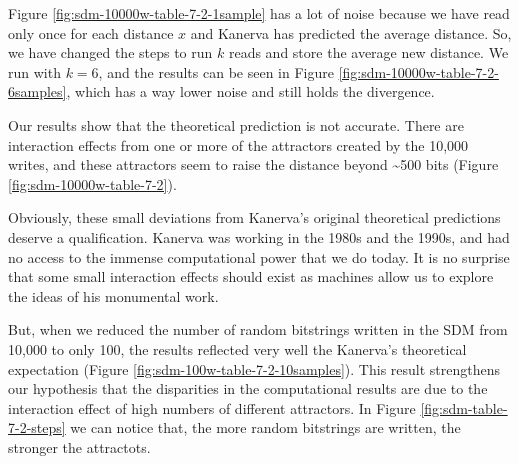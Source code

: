 Figure \ref{fig:sdm-10000w-table-7-2-1sample} has a lot of noise because we have read only once for each distance $x$ and Kanerva has predicted the average distance. So, we have changed the steps to run $k$ reads and store the average new distance. We run with $k=6$, and the results can be seen in Figure \ref{fig:sdm-10000w-table-7-2-6samples}, which has a way lower noise and still holds the divergence.

Our results show that the theoretical prediction is not accurate.  There are interaction effects from one or more of the attractors created by the 10,000 writes, and these attractors seem to raise the distance beyond \textasciitilde 500 bits (Figure \ref{fig:sdm-10000w-table-7-2}).

Obviously, these small deviations from Kanerva's original theoretical predictions deserve a qualification.  Kanerva was working in the 1980s and the 1990s, and had no access to the immense computational power that we do today. It is no surprise that some small interaction effects should exist as machines allow us to explore the ideas of his monumental work.

But, when we reduced the number of random bitstrings written in the SDM from 10,000 to only 100, the results reflected very well the Kanerva's theoretical expectation (Figure \ref{fig:sdm-100w-table-7-2-10samples}). This result strengthens our hypothesis that the disparities in the computational results are due to the interaction effect of high numbers of different attractors. In Figure \ref{fig:sdm-table-7-2-steps} we can notice that, the more random bitstrings are written, the stronger the attractots.

